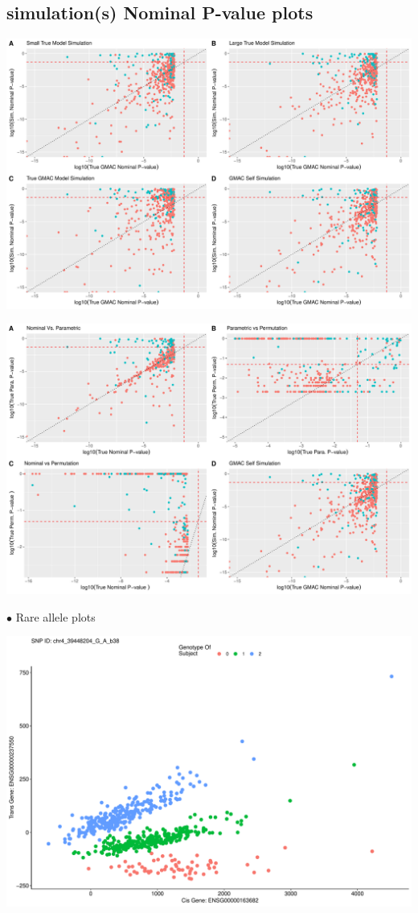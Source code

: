 \documentclass[
]{article}
\begin{document}
\hypertarget{simulations-nominal-p-value-plots}{%
\subsection{simulation(s) Nominal P-value
plots}\label{simulations-nominal-p-value-plots}}

\includegraphics{12_15_2021_GMAC_plots_all_trios_files/figure-latex/unnamed-chunk-6-1.pdf}

\includegraphics{12_15_2021_GMAC_plots_all_trios_files/figure-latex/unnamed-chunk-7-1.pdf}

\(\bullet\) Rare allele plots

\includegraphics{12_15_2021_GMAC_plots_all_trios_files/figure-latex/unnamed-chunk-8-1.pdf}
\end{document}
